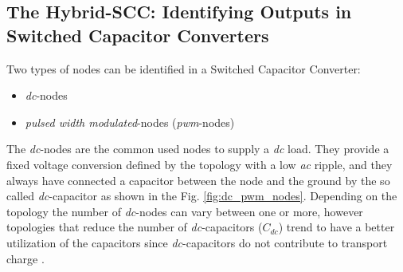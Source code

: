 \subsection[Introducing H-SCC]{The Hybrid-SCC: Identifying Outputs in Switched Capacitor Converters}

Two types of nodes can be identified in a Switched Capacitor Converter:
\begin{itemize}
  \item \emph{dc}-nodes %
  \item \emph{pulsed width modulated}-nodes (\emph{pwm}-nodes) %
\end{itemize}

The \emph{dc}-nodes are the common used nodes to supply a \emph{dc} load. They provide a fixed voltage conversion defined by the topology with a low \emph{ac} ripple, and they always have connected a capacitor between the node and the ground by the so called \emph{dc}-capacitor as shown in the Fig. \ref{fig:dc_pwm_nodes}. Depending on the topology the number of \emph{dc}-nodes can vary between one or more, however topologies that reduce the number of \emph{dc}-capacitors ($C_{dc}$) trend to have a better utilization of the capacitors since \emph{dc}-capacitors do not contribute to transport charge \cite{SeemanPhD06}.

